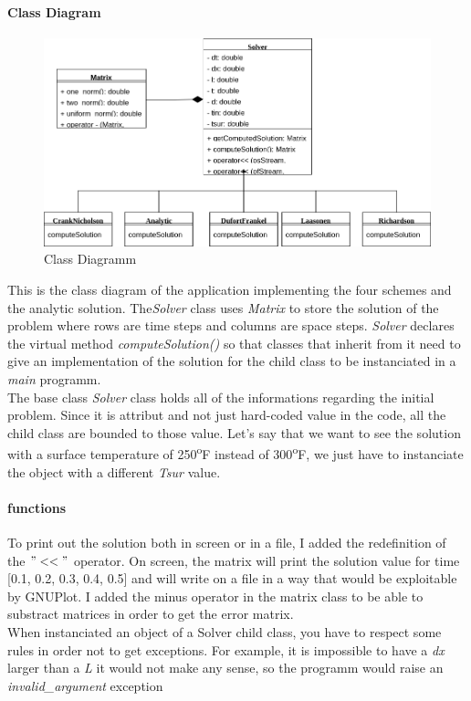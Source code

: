 \documentclass[12pt, a4paper]{report}
\begin{document}
\paragraph{Class Diagram}
\begin{figure}[h]
\centering
\includegraphics[scale=0.5]{ClassDiagram.png}
\caption{Class Diagramm}
\end{figure}

This is the class diagram of the application implementing the four schemes and the analytic solution.  The\textit{Solver} class uses \textit{Matrix} to store the solution of the problem where rows are time steps and columns are space steps. \textit{Solver} declares the virtual method \textit{computeSolution()} so that classes that inherit from it need to give an implementation of the solution for the  child class to be instanciated in a \textit{main} programm.\\
The base class \textit{Solver} class holds all of the informations regarding the initial problem. Since it is attribut and not just hard-coded value in the code, all the child class are bounded to those value. Let's say that we want to see the solution with a surface temperature of 250\textsuperscript{o}F instead of 300\textsuperscript{o}F, we just have to instanciate the object with a different \textit{Tsur} value.
\paragraph{functions}
To print out the solution both in screen or in a file, I added the redefinition of the $"<<"$ operator. On screen, the matrix will print the solution value for time [0.1, 0.2, 0.3, 0.4, 0.5] and will write on a file in a way that would be exploitable by GNUPlot.
I added the minus operator in the matrix class to be able to substract matrices in order to get the error matrix. \\When instanciated an object of a Solver child class, you have to respect some rules in order not to get exceptions. For example, it is impossible to have a \textit{dx} larger than a \textit{L} it would not make any sense, so the programm would raise an \textit{invalid\_argument} exception
\end{document}
